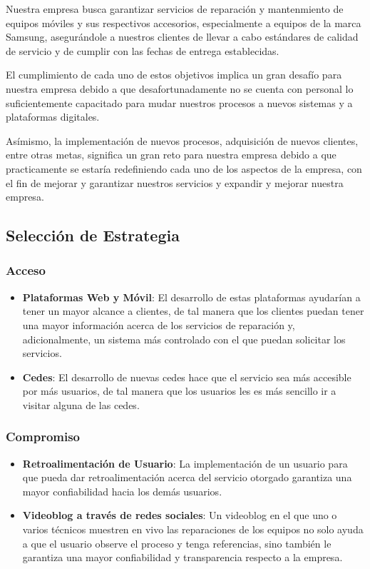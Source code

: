 Nuestra empresa busca garantizar servicios de reparación y mantenmiento de equipos
móviles y sus respectivos accesorios, especialmente a equipos de la marca
Samsung, asegurándole a nuestros clientes de llevar a cabo estándares de calidad
de servicio y de cumplir con las fechas de entrega establecidas.

El cumplimiento de cada uno de estos objetivos implica un gran desafío para nuestra
empresa debido a que desafortunadamente no se cuenta con personal lo suficientemente
capacitado para mudar nuestros procesos a nuevos sistemas y a plataformas digitales.

Asímismo, la implementación de nuevos procesos, adquisición de nuevos clientes,
entre otras metas, significa un gran reto para nuestra empresa debido a que practicamente
se estaría redefiniendo cada uno de los aspectos de la empresa, con el fin de
mejorar y garantizar nuestros servicios y expandir y mejorar nuestra empresa.

\subsection{Selección de Estrategia}

\subsubsection{Acceso}

\begin{itemize}
	\item \textbf{Plataformas Web y Móvil}: El desarrollo de estas plataformas ayudarían
	      a tener un mayor alcance a clientes, de tal manera que los clientes puedan
	      tener una mayor información acerca de los servicios de reparación y, adicionalmente,
	      un sistema más controlado con el que puedan solicitar los servicios.

	\item \textbf{Cedes}: El desarrollo de nuevas cedes hace que el servicio sea más
	      accesible por más usuarios, de tal manera que los usuarios les es más
	      sencillo ir a visitar alguna de las cedes.
\end{itemize}

\subsubsection{Compromiso}

\begin{itemize}
	\item \textbf{Retroalimentación de Usuario}: La implementación de un usuario para
	      que pueda dar retroalimentación acerca del servicio otorgado garantiza una mayor
	      confiabilidad hacia los demás usuarios.

	\item \textbf{Videoblog a través de redes sociales}: Un videoblog en el que uno
	      o varios técnicos muestren en vivo las reparaciones de los equipos no solo ayuda
	      a que el usuario observe el proceso y tenga referencias, sino también le
	      garantiza una mayor confiabilidad y transparencia respecto a la empresa.
\end{itemize}

